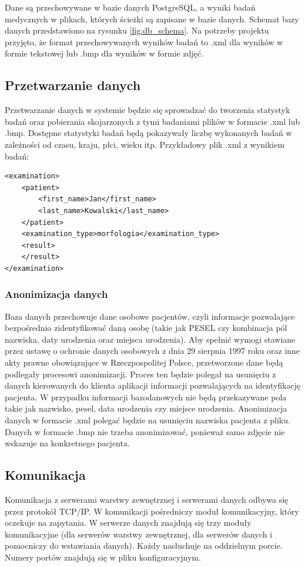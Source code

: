 Dane są przechowywane w bazie danych PostgreSQL, a wyniki badań medycznych w plikach, których ścieżki są zapisane w bazie danych. Schemat bazy danych przedstawiono na rysunku \ref{fig:db_schema}. Na potrzeby projektu przyjęto, że format przechowywanych wyników badań to .xml dla wyników w formie tekstowej lub .bmp dla wyników w formie zdjęć.


\subsection{Przetwarzanie danych}

Przetwarzanie danych w systemie będzie się sprowadzać do tworzenia statystyk badań oraz pobierania skojarzonych z tymi badaniami plików w formacie .xml lub .bmp. Dostępne statystyki badań będą pokazywały liczbę wykonanych badań w zależności od czasu, kraju, płci, wieku itp.
Przykładowy plik .xml z wynikiem badań:
\begin{lstlisting}[style=incode]
<examination>
    <patient>
        <first_name>Jan</first_name>
        <last_name>Kowalski</last_name>
    </patient>
    <examination_type>morfologia</examination_type>
    <result>
    </result>
</examination>
\end{lstlisting}

\subsubsection{Anonimizacja danych}
Baza danych przechowuje dane osobowe pacjentów, czyli informacje pozwalające bezpośrednio zidentyfikować daną osobę (takie jak PESEL czy kombinacja pól nazwiska, daty urodzenia oraz miejsca urodzenia). Aby spełnić wymogi stawiane przez ustawę o ochronie danych osobowych z dnia 29 sierpnia 1997 roku oraz inne akty prawne obowiązujące w Rzeczpospolitej Polsce, przetworzone dane będą podlegały procesowi anonimizacji. Proces ten będzie polegał na usunięciu z danych kierowanych do klienta aplikacji informacji pozwalających na identyfikację pacjenta. W przypadku informacji bazodanowych nie będą przekazywane pola takie jak nazwisko, pesel, data urodzenia czy miejsce urodzenia. Anonimizacja danych w formacie .xml polegać będzie  na usunięciu nazwiska pacjenta z pliku. Danych w formacie .bmp nie trzeba anonimizować, ponieważ samo zdjęcie nie wskazuje na konkretnego pacjenta.

\subsection{Komunikacja}
Komunikacja z serwerami warstwy zewnętrznej i serwerami danych odbywa się przez protokół TCP/IP. W komunikacji pośredniczy moduł komunikacyjny, który oczekuje na zapytania. W serwerze danych znajdują się trzy moduły komunikacyjne (dla serwerów warstwy zewnętrznej, dla serwerów danych i pomocniczy do wstawiania danych). Każdy nasłuchuje na oddzielnym porcie. Numery portów znajdują się w pliku konfiguracyjnym. 


